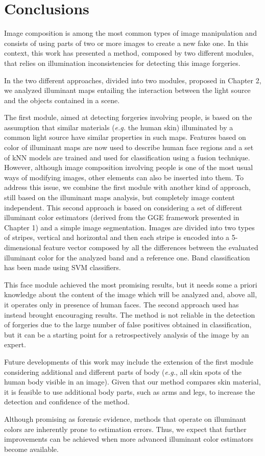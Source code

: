 \chapter*{Conclusions}

Image composition is among the most common types of image manipulation and consists of using parts of two or more images to create a new fake one. In this context, this work has presented a method, composed by two different modules, that relies on illumination inconsistencies for detecting this image forgeries.

In the two different approaches, divided into two modules, proposed in Chapter 2, we analyzed illuminant maps entailing the interaction between the light source and the objects contained in a scene. 

The first module, aimed at detecting forgeries involving people, is based on the assumption that similar materials (\emph{e.g.} the human skin) illuminated by a common light source have similar properties in such maps. Features based on color of illuminant maps are now used to describe human face regions and a set of kNN models are trained and used for classification using a fusion technique. However, although image composition involving people is one of the most usual ways of modifying images, other elements can also be inserted into them. To address this issue, we combine the first module with another kind of approach, still based on the illuminant maps analysis, but completely image content independent. This second approach is based on considering a set of different illuminant color estimators (derived from the GGE framework presented in Chapter 1) and a simple image segmentation. Images are divided into two types of stripes, vertical and horizontal and then each stripe is encoded into a 5-dimensional feature vector composed by all the differences between the evaluated illuminant color for the analyzed band and a reference one. Band classification has been made using SVM classifiers.

This face module achieved the most promising results, but it needs some a priori knowledge about the content of the image which will be analyzed and, above all, it operates only in presence of human faces. The second approach used has instead brought encouraging results. The method is not reliable in the detection of forgeries due to the large number of false positives obtained in classification, but it can be a starting point for a retrospectively analysis of the image by an expert.

Future developments of this work may include the extension of the first module considering additional and different parts of body (\emph{e.g.}, all skin spots of the human body visible in an image). Given that our method compares skin material, it is feasible to use additional body parts, such as arms and legs, to increase the detection and confidence of the method.

Although promising as forensic evidence, methods that operate on illuminant colors are inherently prone to estimation errors. Thus, we expect that further improvements can be achieved when more advanced illuminant color estimators become available.